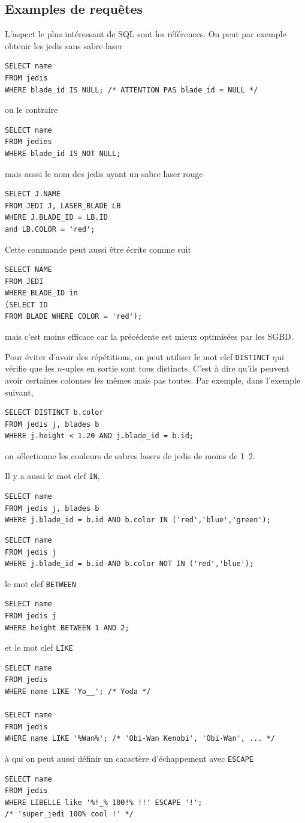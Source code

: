 \subsection{Examples de requêtes}
L'aspect le plus intéressant de SQL sont les références.
On peut par exemple obtenir les jedis sans sabre laser
\begin{lstlisting}
SELECT name
FROM jedis
WHERE blade_id IS NULL; /* ATTENTION PAS blade_id = NULL */
\end{lstlisting}
ou le contraire
\begin{lstlisting}
SELECT name
FROM jedies
WHERE blade_id IS NOT NULL;
\end{lstlisting}
mais aussi le nom des jedis ayant un sabre laser rouge
\begin{lstlisting}
SELECT J.NAME
FROM JEDI J, LASER_BLADE LB
WHERE J.BLADE_ID = LB.ID
and LB.COLOR = 'red';
\end{lstlisting}
Cette commande peut aussi être écrite comme suit
\begin{lstlisting}
SELECT NAME
FROM JEDI
WHERE BLADE_ID in
(SELECT ID
FROM BLADE WHERE COLOR = 'red');
\end{lstlisting}
mais c'est moins efficace car la précédente est mieux optimisées par
les SGBD.

Pour éviter d'avoir des répétitions, on peut utiliser le mot clef
\lstinline|DISTINCT| qui vérifie que les $n$-uples en sortie sont tous
distincts.
C'est à dire qu'ils peuvent avoir certaines colonnes les mêmes mais pas toutes.
Par exemple, dans l'exemple suivant,
\begin{lstlisting}
SELECT DISTINCT b.color
FROM jedis j, blades b
WHERE j.height < 1.20 AND j.blade_id = b.id;
\end{lstlisting}
on sélectionne les couleurs de sabres lasers de jedis de moins
de \unit{1.2}{\meter}.

Il y a aussi le mot clef \lstinline|IN|,
\begin{lstlisting}
SELECT name
FROM jedis j, blades b
WHERE j.blade_id = b.id AND b.color IN ('red','blue','green');
\end{lstlisting}
\begin{lstlisting}
SELECT name
FROM jedis j
WHERE j.blade_id = b.id AND b.color NOT IN ('red','blue');
\end{lstlisting}
le mot clef \lstinline|BETWEEN|
\begin{lstlisting}
SELECT name
FROM jedis j
WHERE height BETWEEN 1 AND 2;
\end{lstlisting}
et le mot clef \lstinline|LIKE|
\begin{lstlisting}
SELECT name
FROM jedis
WHERE name LIKE 'Yo__'; /* Yoda */

SELECT name
FROM jedis
WHERE name LIKE '%Wan%'; /* 'Obi-Wan Kenobi', 'Obi-Wan', ... */
\end{lstlisting}
à qui on peut aussi définir un caractère d'échappement
avec \lstinline|ESCAPE|
\begin{lstlisting}
SELECT name
FROM jedis
WHERE LIBELLE like '%!_% 100!% !!' ESCAPE '!';
/* 'super_jedi 100% cool !' */
\end{lstlisting}

